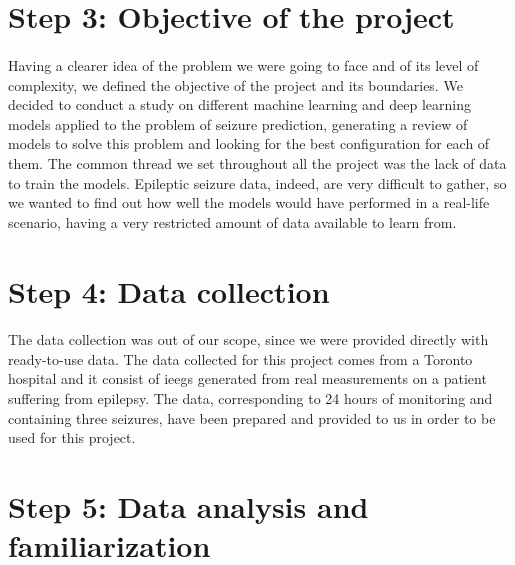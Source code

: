
\section{Step 3: Objective of the project} \label{sec: step_objective_project}
\paragraph{} Having a clearer idea of the problem we were going to face and of its level of complexity, we defined the objective of the project and its boundaries. We decided to conduct a study on different machine learning and deep learning models applied to the problem of seizure prediction, generating a review of models to solve this problem and looking for the best configuration for each of them. The common thread we set throughout all the project was the lack of data to train the models. Epileptic seizure data, indeed, are very difficult to gather, so we wanted to find out how well the models would have performed in a real-life scenario, having a very restricted amount of data available to learn from.


\section{Step 4: Data collection} \label{sec: step_data_collection}
\paragraph{} The data collection was out of our scope, since we were provided directly with ready-to-use data. The data collected for this project comes from a Toronto hospital and it consist of \acsp{ieeg} generated from real measurements on a patient suffering from epilepsy. The data, corresponding to 24 hours of monitoring and containing three seizures, have been prepared and provided to us in order to be used for this project.


\section{Step 5: Data analysis and familiarization} \label{sec: step_data_analysis_familiarization}
